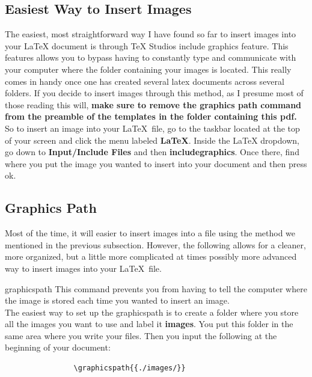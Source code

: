 \documentclass[12pt,hidelinks]{article}
\begin{document}
	\subsection{Easiest Way to Insert Images}
	The easiest, most straightforward way I have found so far to insert images into your LaTeX document is through TeX Studios include graphics feature. This features allows you to bypass having to constantly type and communicate with your computer where the folder containing your images is located. This really comes in handy once one has created several latex documents across several folders. If you decide to insert images through this method, as I presume most of those reading this will, \textbf{make sure to remove the graphics path command from the preamble of the templates in the folder containing this pdf.}
\vspace{4mm}\\
	So to insert an image into your \LaTeX\ file, go to the taskbar located at the top of your screen and click the menu labeled \textbf{LaTeX}. Inside the LaTeX dropdown, go down to \textbf{Input/Include Files} and then \textbf{includegraphics}. Once there, find where you put the image you wanted to insert into your document and then press ok.
	\subsection{Graphics Path}
	Most of the time, it will easier to insert images into a file using the method we mentioned in the previous subsection. However, the following allows for a cleaner, more organized, but a little more complicated at times possibly more advanced way to insert images into your \LaTeX\ file.
		\begin{docCommand}{graphicspath}{}
			This command prevents you from having to tell the computer where the image is stored each time you wanted to insert an image.\\
			The easiest way to set up the graphicspath is to create a folder where you store all the images you want to use and label it \textbf{images}. You put this folder in the same area where you write your files. Then you input the following at the beginning of your document: 
			\begin{verbatim}
				\graphicspath{{./images/}}
			\end{verbatim}
		\end{docCommand}
\end{document}
